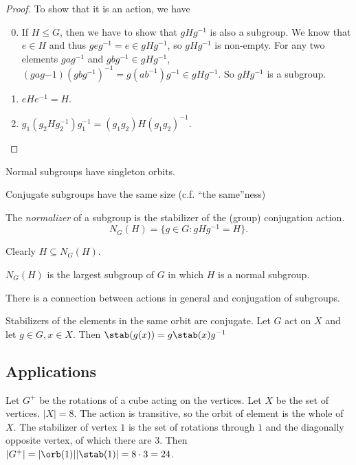 \documentclass[a4paper]{article}
\begin{document}
  \begin{proof}
    To show that it is an action, we have
    \begin{enumerate}[label=\arabic{*}.]
        \setcounter{enumi}{-1}
      \item If $H\leq G$, then we have to show that $gHg^{-1}$ is also a subgroup. We know that $e\in H$ and thus $geg^{-1} = e\in gHg^{-1}$, so $gHg^{-1}$ is non-empty. For any two elements $gag^{-1}$ and $gbg^{-1}\in gHg^{-1}$, $(gag{-1})(gbg^{-1})^{-1} = g(ab^{-1})g^{-1}\in gHg^{-1}$. So $gHg^{-1}$ is a subgroup.
      \item $eHe^{-1} = H$.
      \item $g_1(g_2Hg_2^{-1})g_1^{-1} = (g_1g_2)H(g_1g_2)^{-1}$.
    \end{enumerate}
  \end{proof}
  \note Normal subgroups have singleton orbits.

  \note Conjugate subgroups have the same size (c.f. ``the same''ness)

  \begin{defi}
    The \emph{normalizer} of a subgroup is the stabilizer of the (group) conjugation action.
    \[
      N_G(H) = \{g\in G: gHg^{-1} = H\}.
    \]
  \end{defi}
  \note Clearly $H\subseteq N_G(H)$.

  \begin{prop}
    $N_G(H)$ is the largest subgroup of $G$ in which $H$ is a normal subgroup.
  \end{prop}

  There is a connection between actions in general and conjugation of subgroups.

  \begin{lemma}
    Stabilizers of the elements in the same orbit are conjugate. Let $G$ act on $X$ and let $g\in G, x\in X$. Then $\stab(g(x)) = g\stab(x)g^{-1}$
  \end{lemma}

  \subsection{Applications}
  \begin{eg}
    Let $G^{+}$ be the rotations of a cube acting on the vertices. Let $X$ be the set of vertices. $|X| = 8$. The action is transitive, so the orbit of element is the whole of $X$. The stabilizer of vertex $1$ is the set of rotations through $1$ and the diagonally opposite vertex, of which there are 3. Then $|G^{+}| = |\orb(1)||\stab(1)| = 8\cdot 3 = 24$.
  \end{eg}
\end{document}
